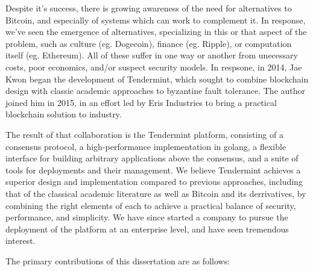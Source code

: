 Despite it's success, there is growing awareness of the need for alternatives to Bitcoin, and especially of systems which can work to complement it.
In response, we've seen the emergence of alternatives, specializing in this or that aspect of the problem, such as culture (eg. Dogecoin), finance (eg. Ripple), 
or computation itself (eg. Ethereum).
All of these suffer in one way or another from unecessary costs, poor economics, and/or suspect security models.
In respsone, in 2014, Jae Kwon began the development of Tendermint, which sought to combine blockchain design with classic academic approaches to byzantine fault tolerance.
The author joined him in 2015, in an effort led by Eris Industries to bring a practical blockchain solution to industry.

The result of that collaboration is the Tendermint platform, consisting of a consensus protocol, a high-performance implementation in golang, 
a flexible interface for building arbitrary applications above the consensus, and a suite of tools for deployments and their management.
We believe Tendermint achieves a superior design and implementation compared to previous approaches, 
including that of the classical academic literature as well as Bitcoin and its derrivatives,
by combining the right elements of each to achieve a practical balance of security, performance, and simplicity.
We have since started a company to pursue the deployment of the platform at an enterprise level, and have seen tremendous interest.

The primary contributions of this dissertation are as follows:


